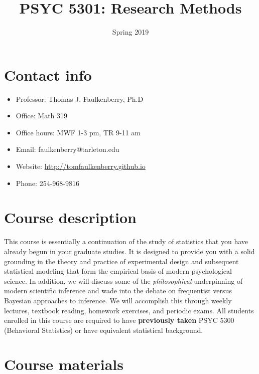 \documentclass[10pt]{article}
\date{Spring 2019}
\title{PSYC 5301: Research Methods}
\begin{document}
\maketitle

\section*{Contact info}
\label{sec:orgbaf2964}
\begin{itemize}
\item Professor: Thomas J. Faulkenberry, Ph.D
\item Office: Math 319
\item Office hours: MWF 1-3 pm, TR 9-11 am
\item Email: faulkenberry@tarleton.edu
\item Website: \url{http://tomfaulkenberry.github.io}
\item Phone: 254-968-9816
\end{itemize}

\section*{Course description}
\label{sec:org6b58e5d}

This course is essentially a continuation of the study of statistics that you have already begun in your graduate studies. It is designed to provide you with a solid grounding in the theory and practice of experimental design and subsequent statistical modeling that form the empirical basis of modern psychological science. In addition, we will discuss some of the \emph{philosophical} underpinning of modern scientific inference and wade into the debate on frequentist versus Bayesian approaches to inference.  We will accomplish this through weekly lectures, textbook reading, homework exercises, and periodic exams. All students enrolled in this course are required to have \textbf{previously taken} PSYC 5300 (Behavioral Statistics) or have equivalent statistical background.

\section*{Course materials}
\label{sec:org6142f74}
\end{document}
